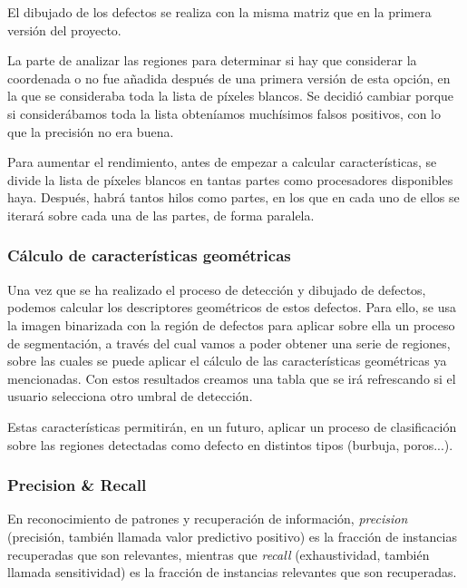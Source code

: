 
El dibujado de los defectos se realiza con la misma matriz que en la primera versión del proyecto.

La parte de analizar las regiones para determinar si hay que considerar la coordenada o no fue añadida después de una primera versión de esta opción, en la que se consideraba toda la lista de píxeles blancos. Se decidió cambiar porque si considerábamos toda la lista obteníamos muchísimos falsos positivos, con lo que la precisión no era buena.

Para aumentar el rendimiento, antes de empezar a calcular características, se divide la lista de píxeles blancos en tantas partes como procesadores disponibles haya. Después, habrá tantos hilos como partes, en los que en cada uno de ellos se iterará sobre cada una de las partes, de forma paralela.

\subsubsection{Cálculo de características geométricas}
Una vez que se ha realizado el proceso de detección y dibujado de defectos, podemos calcular los descriptores geométricos de estos defectos. Para ello, se usa la imagen binarizada con la región de defectos para aplicar sobre ella un proceso de segmentación, a través del cual vamos a poder obtener una serie de regiones, sobre las cuales se puede aplicar el cálculo de las características geométricas ya mencionadas. Con estos resultados creamos una tabla que se irá refrescando si el usuario selecciona otro umbral de detección.

Estas características permitirán, en un futuro, aplicar un proceso de clasificación sobre las regiones detectadas como defecto en distintos tipos (burbuja, poros...).

\subsubsection{Precision \& Recall}
En reconocimiento de patrones y recuperación de información, \textit{precision} (precisión, también llamada valor predictivo positivo) es la fracción de instancias recuperadas que son relevantes, mientras que \textit{recall} (exhaustividad, también llamada sensitividad) es la fracción de instancias relevantes que son recuperadas.

